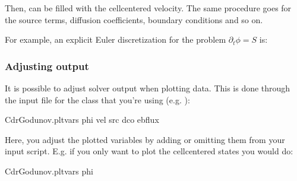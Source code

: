 \documentclass[letterpaper,10pt,english]{sphinxmanual}
\begin{document}
Then,  can be filled with the cell\sphinxhyphen{}centered velocity.
The same procedure goes for the source terms, diffusion coefficients, boundary conditions and so on.

For example, an explicit Euler discretization for the problem \(\partial_t\phi = S\) is:

\begin{sphinxVerbatim}[commandchars=\\\{\},formatcom=\scriptsize]
 

    

   
   

  
\end{sphinxVerbatim}


\subsubsection{Adjusting output}
\label{\detokenize{Solvers/CDR:adjusting-output}}
It is possible to adjust solver output when plotting data.
This is done through the input file for the class that you’re using (e.g. ):

\begin{sphinxVerbatim}[commandchars=\\\{\},formatcom=\scriptsize]
CdrGodunov.plt\PYGZus{}vars  phi vel src dco ebflux  
\end{sphinxVerbatim}

Here, you adjust the plotted variables by adding or omitting them from your input script.
E.g. if you only want to plot the cell\sphinxhyphen{}centered states you would do:

\begin{sphinxVerbatim}[commandchars=\\\{\},formatcom=\scriptsize]
CdrGodunov.plt\PYGZus{}vars  phi  
\end{sphinxVerbatim}
\end{document}

